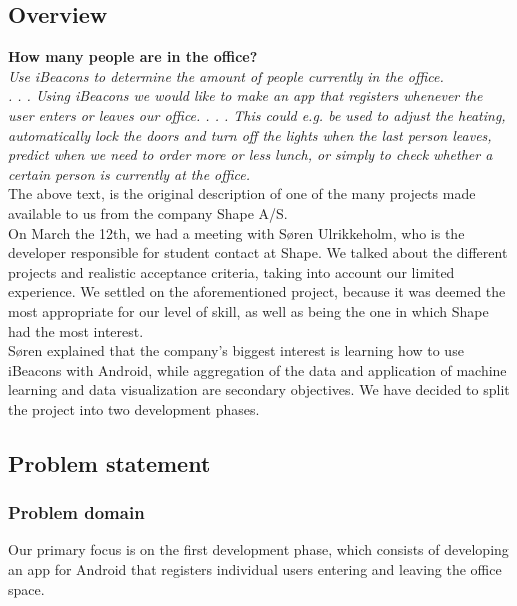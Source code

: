 \documentclass[12pt]{article}
\begin{document}
\subsection{Overview}
\textbf{How many people are in the office?}\\
\textit{Use iBeacons to determine the amount of people currently in the office. \\
. . .
Using iBeacons we would like to make an app that registers whenever the user enters or leaves our office. . . . This could e.g. be used to adjust the heating, automatically lock the doors and turn off the lights when the last person leaves, predict when we need to order more or less lunch, or simply to check whether a certain person is currently at the office.} \cite{website}\\

The above text, is the original description of one of the many projects made available to us from the company Shape A/S.\\

On March the 12th, we had a meeting with S\o ren Ulrikkeholm, who is the developer responsible for student contact at Shape. We talked about the different projects and realistic acceptance criteria, taking into account our limited experience. We settled on the aforementioned project, because it was deemed the most appropriate for our level of skill, as well as being the one in which Shape had the most interest.\\

S\o ren explained that the company's biggest interest is learning how to use iBeacons with Android, while aggregation of the data and application of machine learning and data visualization are secondary objectives. We have decided to split the project into two development phases.\\



\subsection{Problem statement}

\subsubsection{Problem domain}
Our primary focus is on the first development phase, which consists of developing an app for Android that registers individual users entering and leaving the office space.\\
\end{document}

